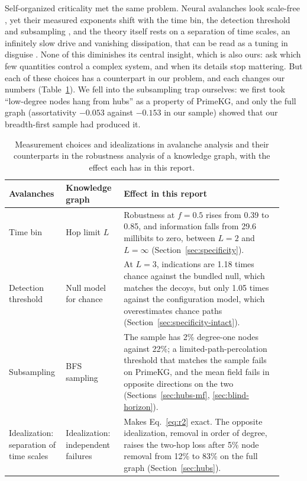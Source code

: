 Self-organized criticality met the same problem. Neural avalanches look
scale-free \cite{beggs2003neuronal}, yet their measured exponents shift with the
time bin, the detection threshold and subsampling
\cite{priesemann2009subsampling}, and the theory itself rests on a separation of
time scales, an infinitely slow drive and vanishing dissipation, that can be
read as a tuning in disguise \cite{dickman2000paths}. None of this diminishes
its central insight, which is also ours: ask which few quantities control a
complex system, and when its details stop mattering. But each of these choices
has a counterpart in our problem, and each changes our numbers
(Table~\ref{tab:choices}). We fell into the subsampling trap ourselves: we first
took ``low-degree nodes hang from hubs'' as a property of PrimeKG, and only the
full graph (assortativity $-0.053$ against $-0.153$ in our sample) showed that
our breadth-first sample had produced it.

\begin{table}[!htbp]
\centering
\small
\caption{Measurement choices and idealizations in avalanche analysis and their
counterparts in the robustness analysis of a knowledge graph, with the effect
each has in this report.}
\label{tab:choices}
\begin{tabular}{@{}>{\raggedright\arraybackslash}p{0.17\linewidth}>{\raggedright\arraybackslash}p{0.2\linewidth}>{\raggedright\arraybackslash}p{0.55\linewidth}@{}}
\toprule
Avalanches & Knowledge graph & Effect in this report \\
\midrule
Time bin & Hop limit $L$ & Robustness at $f=0.5$ rises from 0.39 to 0.85, and information falls from 29.6 millibits to zero, between $L=2$ and $L=\infty$ (Section~\ref{sec:specificity}). \\
Detection threshold & Null model for chance & At $L=3$, indications are 1.18 times chance against the bundled null, which matches the decoys, but only 1.05 times against the configuration model, which overestimates chance paths (Section~\ref{sec:specificity-intact}). \\
Subsampling & BFS sampling & The sample has 2\% degree-one nodes against 22\%; a limited-path-percolation threshold that matches the sample fails on PrimeKG, and the mean field fails in opposite directions on the two (Sections~\ref{sec:hubs-mf}, \ref{sec:blind-horizon}). \\
Idealization: separation of time scales & Idealization: independent failures & Makes Eq.~\eqref{eq:r2} exact. The opposite idealization, removal in order of degree, raises the two-hop loss after 5\% node removal from 12\% to 83\% on the full graph (Section~\ref{sec:hubs}). \\
\bottomrule
\end{tabular}
\end{table}

